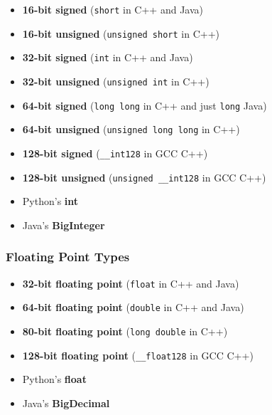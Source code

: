 \begin{itemize}
\item \textbf{16-bit signed} (\texttt{short} in C++ and Java)
\item \textbf{16-bit unsigned} (\texttt{unsigned short} in C++)
\item \textbf{32-bit signed} (\texttt{int} in C++ and Java)
\item \textbf{32-bit unsigned} (\texttt{unsigned int} in C++)
\item \textbf{64-bit signed} (\texttt{long long} in C++ and just \texttt{long} Java)
\item \textbf{64-bit unsigned} (\texttt{unsigned long long} in C++)
\item \textbf{128-bit signed} (\texttt{__int128} in GCC C++)
\item \textbf{128-bit unsigned} (\texttt{unsigned __int128} in GCC C++)
\item Python's \textbf{int} 
\item Java's \textbf{BigInteger}
\end{itemize}

\subsubsection{Floating Point Types}

\begin{itemize}
\item \textbf{32-bit floating point} (\texttt{float} in C++ and Java)
\item \textbf{64-bit floating point} (\texttt{double} in C++ and Java)
\item \textbf{80-bit floating point} (\texttt{long double} in C++)
\item \textbf{128-bit floating point} (\texttt{__float128} in GCC C++)
\item Python's \textbf{float}
\item Java's \textbf{BigDecimal}
\end{itemize}
